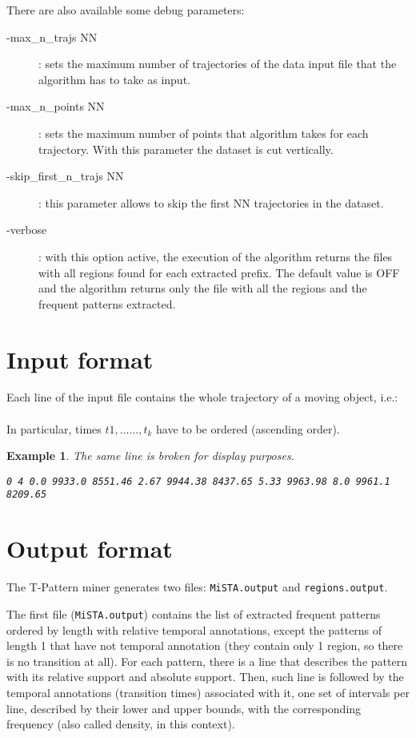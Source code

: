 \documentclass[12pt]{article}
\newtheorem{example}{Example}
\begin{document}
There are also available some debug parameters:

\begin{description}
\item[-max\_n\_trajs NN] : sets the maximum number of trajectories of the data input file that the algorithm has to take as input.
\item[-max\_n\_points NN] : sets the maximum number of points that algorithm takes for each trajectory. With this parameter the dataset is cut vertically.
\item[-skip\_first\_n\_trajs NN]: this parameter allows to skip the first NN trajectories in the dataset.
\item[-verbose]: with this option active, the execution of the algorithm returns the files with all regions found for each extracted prefix. The default value is OFF and the algorithm returns only the file with all the regions and the frequent patterns extracted.
\end{description}

\section{Input format}

Each line of the input file contains the whole trajectory of a moving object, i.e.:\\

\\

In particular, times $t1, \ldots..., t_k$ have to be ordered (ascending order).

\begin{example}
The same line is broken for display purposes.

\texttt{0 4 0.0 9933.0 8551.46 2.67 9944.38 8437.65 5.33 9963.98  8.0 9961.1 8209.65}
\end{example}

\section{Output format}

The T-Pattern miner generates two files: \texttt{MiSTA.output} and \texttt{regions.output}. 

The first file (\texttt{MiSTA.output}) contains the list of extracted frequent patterns ordered by length with relative temporal annotations, except the patterns of length 1 that have not temporal annotation (they contain only 1 region, so there is no transition at all). For each pattern, there is a line that describes the pattern with its relative support and absolute support. Then, such line is followed by the temporal annotations (transition times) associated with it, one set of intervals per line, described by their lower and upper bounds, with the corresponding frequency (also called density, in this context).
\end{document}
